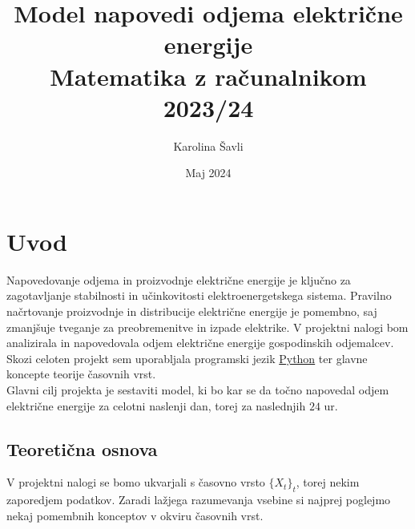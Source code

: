 \documentclass[a4paper, 11pt]{article}
\begin{document}
\title{\textbf{\LARGE{Model napovedi odjema električne energije}} \\ Matematika z računalnikom 2023/24}
\author{Karolina Šavli}
\date{Maj 2024}

\maketitle



\section{Uvod}

Napovedovanje odjema in proizvodnje električne energije je ključno za zagotavljanje stabilnosti in učinkovitosti elektroenergetskega sistema. 
Pravilno načrtovanje proizvodnje in distribucije električne energije je pomembno, saj zmanjšuje tveganje za 
preobremenitve in izpade elektrike. V projektni nalogi bom analizirala in napovedovala odjem električne 
energije gospodinskih odjemalcev. Skozi celoten projekt sem 
uporabljala programski jezik \href{https://www.python.org/}{Python} ter glavne koncepte teorije časovnih vrst. \\

\noindent Glavni cilj projekta je sestaviti model, ki bo kar se da točno napovedal odjem električne energije 
za celotni naslenji dan, torej za naslednjih $24$ ur.


\subsection{Teoretična osnova}

\noindent V projektni nalogi se bomo ukvarjali s časovno vrsto $\{X_t\}_t$, torej nekim zaporedjem podatkov. 
Zaradi lažjega razumevanja vsebine si najprej poglejmo
nekaj pomembnih konceptov v okviru časovnih vrst. \\
\end{document}
